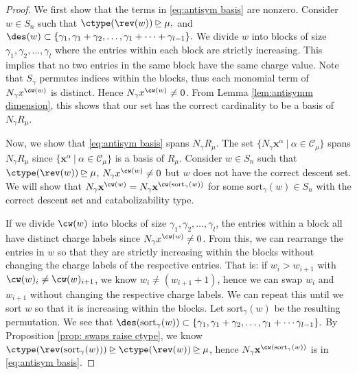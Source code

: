 \begin{proof}

We first show that the terms in \eqref{eq:antisym basis} are nonzero. 
Consider $w\in S_n$ such that $\ctype(\rev(w)) \unrhd \mu,$ and $\des(w) \subset \{\gamma_1,\gamma_1 + \gamma_2, \dots, \gamma_1 + \cdots + \gamma_{l-1}\}.$ 
We divide $w$ into blocks of size $\gamma_1,\gamma_2,\dots, \gamma_{l}$ where the entries within each block are strictly increasing. 
This implies that no two entries in the same block have the same charge value.
Note that $S_\gamma$ permutes indices within the blocks, thus each monomial term of $N_{\gamma}x^{\cw(w)}$ is distinct. 
Hence $N_{\gamma} x^{\cw(w)} \neq 0$.
From Lemma \ref{lem:antisymm dimension}, this shows that our set has the correct cardinality to be a basis of $N_{\gamma}R_{\mu}$. 

Now, we show that \eqref{eq:antisym basis} spans $N_\gamma R_{\mu}$. The set $\{N_\gamma \mathbf{x}^\alpha \ | \ \alpha \in \mathcal{C}_\mu\}$
spans $N_\gamma R_{\mu}$ since $\{\mathbf{x}^\alpha \ | \ \alpha \in \mathcal{C}_\mu\}$ is a basis of $R_{\mu}$.
Consider $w\in S_n$ such that $\ctype(\rev(w))\unrhd\mu$, $N_\gamma x^{\cw(w)} \neq 0$ but $w$ does not have the correct descent set. We will show that $N_\gamma\mathbf{x}^{\cw(w)} = N_\gamma\mathbf{x}^{\cw(\text{sort}_\gamma (w))}$  for some $\text{sort}_\gamma(w)\in S_n$ with the correct descent set and catabolizability type.

If we divide $\cw(w)$ into blocks of size $\gamma_1,\gamma_2,\dots, \gamma_{l}$, the entries within a block all have distinct charge labels since $N_\gamma x^{\cw(w)} \neq 0$. 
From this, we can rearrange the entries in $w$ so that they are strictly increasing within the blocks without changing the charge labels of the respective entries. That is: if $w_i > w_{i+1}$ with $\cw(w)_i \neq \cw(w)_{i+1}$, we know $w_i \neq (w_{i+1} + 1)$, hence we can swap $w_i$ and $w_{i+1}$ without changing the respective charge labels.
We can repeat this until we sort $w$ so that it is increasing within the blocks. Let $\text{sort}_\gamma(w)$ be the resulting permutation.
We see that $\des(\text{sort}_\gamma(w) )\subset \{\gamma_1,\gamma_1+\gamma_2,\dots, \gamma_1+ \cdots \gamma_{l-1}\}.$ 
 By Proposition \ref{prop: swaps raise ctype}, we know $\ctype(\rev(\text{sort}_\gamma(w))) \unrhd \ctype(\rev(w)) \unrhd \mu$, hence $N_\gamma \mathbf{x}^{\cw(\text{sort}_\gamma(w))}$ is in  \eqref{eq:antisym basis}.
\end{proof}

